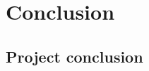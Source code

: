 \chapter{Conclusion}
\label{ch:Conclusion}

\section{Project conclusion}
\label{sec:Project-Conclusion}


